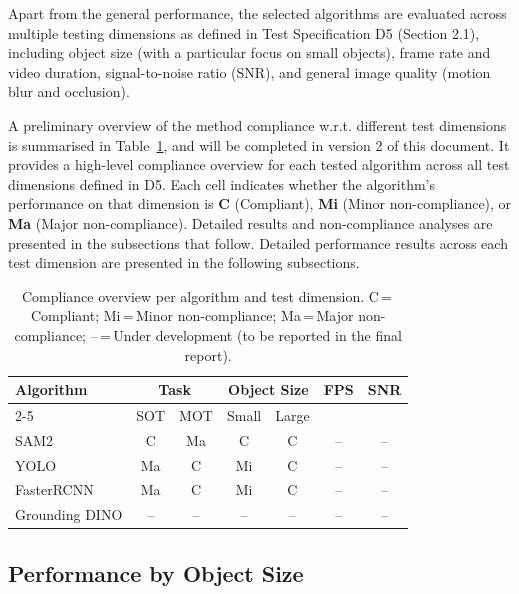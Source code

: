 \documentclass[11pt]{article}
\begin{document}
Apart from the general performance, the selected algorithms are evaluated across 
multiple testing dimensions as defined in Test Specification D5 (Section 2.1), including 
object size (with a particular focus on small objects), frame rate and video duration, 
signal-to-noise ratio (SNR), and general image quality (motion blur and occlusion).

A preliminary overview of the method compliance w.r.t. different test dimensions 
is summarised in Table~\ref{tab:compliance-overview}, and will be completed in 
version 2 of this document. It provides a high-level compliance overview for each tested algorithm across all test dimensions defined in D5.
Each cell indicates whether the algorithm's performance on that dimension is \textbf{C} (Compliant), \textbf{Mi} (Minor non-compliance), or \textbf{Ma} (Major non-compliance).
Detailed results and non-compliance analyses are presented in the subsections that follow.
Detailed performance results across each test dimension are presented in the 
following subsections.

\begin{table}[h]
\centering
\begin{tabular}{|l|c|c|c|c|c|c|}
\hline
\multirow{2}{*}{\textbf{Algorithm}} & \multicolumn{2}{c|}{\textbf{Task}} & \multicolumn{2}{c|}{\textbf{Object Size}} & \multirow{2}{*}{\textbf{FPS}} & \multirow{2}{*}{\textbf{SNR}} \\
\cline{2-5}
 & SOT & MOT & Small & Large & & \\
\hline
SAM2 & C & Ma & C & C & -- & -- \\
\hline
YOLO & Ma & C & Mi & C & -- & -- \\
\hline
FasterRCNN & Ma & C & Mi & C & -- & -- \\
\hline
Grounding DINO & -- & -- & -- & -- & -- & -- \\
\hline
% 
\end{tabular}
\caption{Compliance overview per algorithm and test dimension. C\,=\,Compliant; Mi\,=\,Minor non-compliance; Ma\,=\,Major non-compliance; --\,=\,Under development (to be reported in the final report).\label{tab:compliance-overview}}
\end{table}

\hypertarget{Performance by Object Size}{%
\subsection{Performance by Object Size}\label{Performance by Object Size}}
\end{document}
